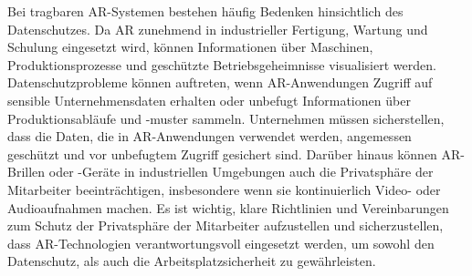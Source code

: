 Bei tragbaren AR-Systemen bestehen häufig Bedenken hinsichtlich des
Datenschutzes. Da AR zunehmend in industrieller Fertigung, Wartung und Schulung
eingesetzt wird, können Informationen über Maschinen, Produktionsprozesse und
geschützte Betriebsgeheimnisse visualisiert werden. Datenschutzprobleme können
auftreten, wenn AR-Anwendungen Zugriff auf sensible Unternehmensdaten erhalten
oder unbefugt Informationen über Produktionsabläufe und -muster sammeln.
Unternehmen müssen sicherstellen, dass die Daten, die in AR-Anwendungen
verwendet werden, angemessen geschützt und vor unbefugtem Zugriff gesichert
sind. Darüber hinaus können AR-Brillen oder -Geräte in industriellen Umgebungen
auch die Privatsphäre der Mitarbeiter beeinträchtigen, insbesondere wenn sie
kontinuierlich Video- oder Audioaufnahmen machen. Es ist wichtig, klare
Richtlinien und Vereinbarungen zum Schutz der Privatsphäre der Mitarbeiter
aufzustellen und sicherzustellen, dass AR-Technologien verantwortungsvoll
eingesetzt werden, um sowohl den Datenschutz, als auch die
Arbeitsplatzsicherheit zu gewährleisten.\cite{de2018augmented,9613426}